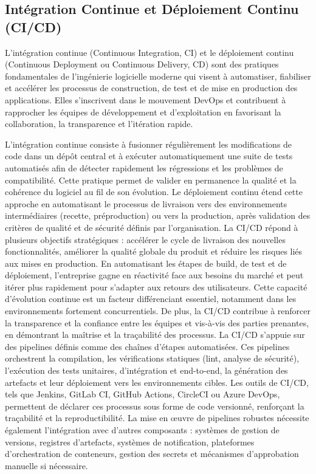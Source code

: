 \subsection{Intégration Continue et Déploiement Continu (CI/CD)}

L’intégration continue (Continuous Integration, CI) et le déploiement continu (Continuous Deployment ou Continuous Delivery, CD) sont des pratiques fondamentales de l’ingénierie logicielle moderne qui visent à automatiser, fiabiliser et accélérer les processus de construction, de test et de mise en production des applications. Elles s’inscrivent dans le mouvement DevOps et contribuent à rapprocher les équipes de développement et d’exploitation en favorisant la collaboration, la transparence et l’itération rapide.

L’intégration continue consiste à fusionner régulièrement les modifications de code dans un dépôt central et à exécuter automatiquement une suite de tests automatisés afin de détecter rapidement les régressions et les problèmes de compatibilité. Cette pratique permet de valider en permanence la qualité et la cohérence du logiciel au fil de son évolution. Le déploiement continu étend cette approche en automatisant le processus de livraison vers des environnements intermédiaires (recette, préproduction) ou vers la production, après validation des critères de qualité et de sécurité définis par l’organisation.
La CI/CD répond à plusieurs objectifs stratégiques : accélérer le cycle de livraison des nouvelles fonctionnalités, améliorer la qualité globale du produit et réduire les risques liés aux mises en production. En automatisant les étapes de build, de test et de déploiement, l’entreprise gagne en réactivité face aux besoins du marché et peut itérer plus rapidement pour s’adapter aux retours des utilisateurs. Cette capacité d’évolution continue est un facteur différenciant essentiel, notamment dans les environnements fortement concurrentiels. De plus, la CI/CD contribue à renforcer la transparence et la confiance entre les équipes et vis-à-vis des parties prenantes, en démontrant la maîtrise et la traçabilité des processus.
La CI/CD s’appuie sur des pipelines définis comme des chaînes d’étapes automatisées. Ces pipelines orchestrent la compilation, les vérifications statiques (lint, analyse de sécurité), l’exécution des tests unitaires, d’intégration et end-to-end, la génération des artefacts et leur déploiement vers les environnements cibles. Les outils de CI/CD, tels que Jenkins, GitLab CI, GitHub Actions, CircleCI ou Azure DevOps, permettent de déclarer ces processus sous forme de code versionné, renforçant la traçabilité et la reproductibilité. La mise en œuvre de pipelines robustes nécessite également l’intégration avec d’autres composants : systèmes de gestion de versions, registres d’artefacts, systèmes de notification, plateformes d’orchestration de conteneurs, gestion des secrets et mécanismes d’approbation manuelle si nécessaire.

